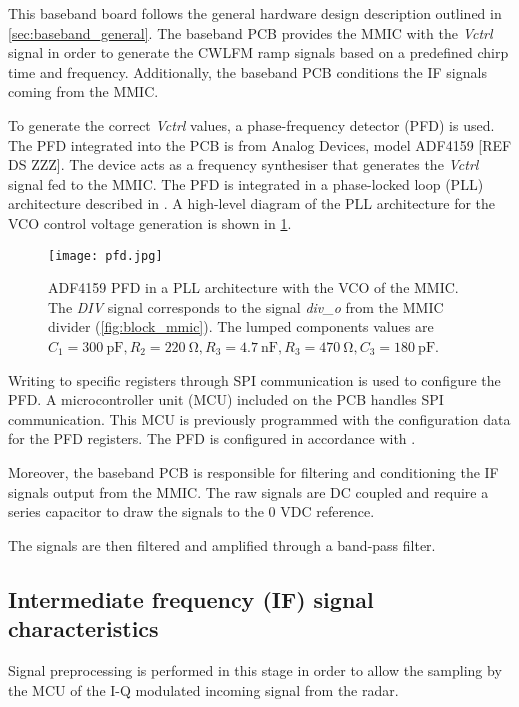 This baseband board follows the general hardware design description outlined in \cref{sec:baseband_general}. The baseband PCB provides the MMIC with the \textit{Vctrl} signal in order to generate the CWLFM ramp signals based on a predefined chirp time and frequency. Additionally, the baseband PCB conditions the IF signals coming from the MMIC.

To generate the correct \textit{Vctrl} values, a phase-frequency detector (PFD) is used. The PFD integrated into the PCB is from Analog Devices, model ADF4159 [REF DS ZZZ]. The device acts as a frequency synthesiser that generates the \textit{Vctrl} signal fed to the MMIC. The PFD is integrated in a phase-locked loop (PLL) architecture described in \cite{Sardinero2022}. A high-level diagram of the PLL architecture for the VCO control voltage generation is shown in \cref{fig:pfd_pll}.

\begin{figure}[ht]
	\centering
	\texttt{[image: pfd.jpg]}
	\caption{ADF4159 PFD in a PLL architecture with the VCO of the MMIC. The \textit{DIV} signal corresponds to the signal \textit{div\_o} from the MMIC divider (\cref{fig:block_mmic}). The lumped components values are $C_1=\SI{300}{\pico\farad}, R_2=\SI{220}{\ohm}, R_3=\SI{4.7}{\nano\farad},R_3=\SI{470}{\ohm}, C_3=\SI{180}{\pico\farad}$. \cite{Sardinero2022} \label{fig:pfd_pll}}
\end{figure}

Writing to specific registers through SPI communication is used to configure the PFD. A microcontroller unit (MCU) included on the PCB handles SPI communication. This MCU is previously programmed with the configuration data for the PFD registers. The PFD is configured in accordance with \cite{Sardinero2022}.

Moreover, the baseband PCB is responsible for filtering and conditioning the IF signals output from the MMIC. The raw signals are DC coupled and require a series capacitor to draw the signals to the 0 VDC reference. 

The signals are then filtered and amplified through a band-pass filter. 


\subsection{Intermediate frequency (IF) signal characteristics}

Signal preprocessing is performed in this stage in order to allow the sampling by the MCU of the I-Q modulated incoming signal from the radar.

